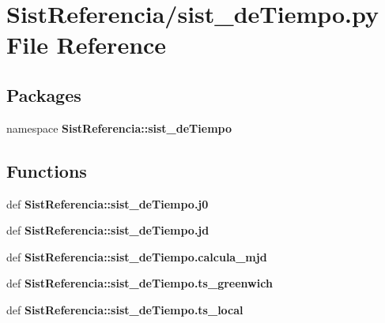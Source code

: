 \section{\-Sist\-Referencia/sist\-\_\-de\-Tiempo.py \-File \-Reference}
\label{sist__de_tiempo_8py}
\subsection*{\-Packages}
\begin{DoxyCompactItemize}
\item 
namespace {\bf \-Sist\-Referencia\-::sist\-\_\-de\-Tiempo}
\end{DoxyCompactItemize}
\subsection*{\-Functions}
\begin{DoxyCompactItemize}
\item 
def {\bf \-Sist\-Referencia\-::sist\-\_\-de\-Tiempo.\-j0}
\item 
def {\bf \-Sist\-Referencia\-::sist\-\_\-de\-Tiempo.\-jd}
\item 
def {\bf \-Sist\-Referencia\-::sist\-\_\-de\-Tiempo.\-calcula\-\_\-mjd}
\item 
def {\bf \-Sist\-Referencia\-::sist\-\_\-de\-Tiempo.\-ts\-\_\-greenwich}
\item 
def {\bf \-Sist\-Referencia\-::sist\-\_\-de\-Tiempo.\-ts\-\_\-local}
\end{DoxyCompactItemize}
